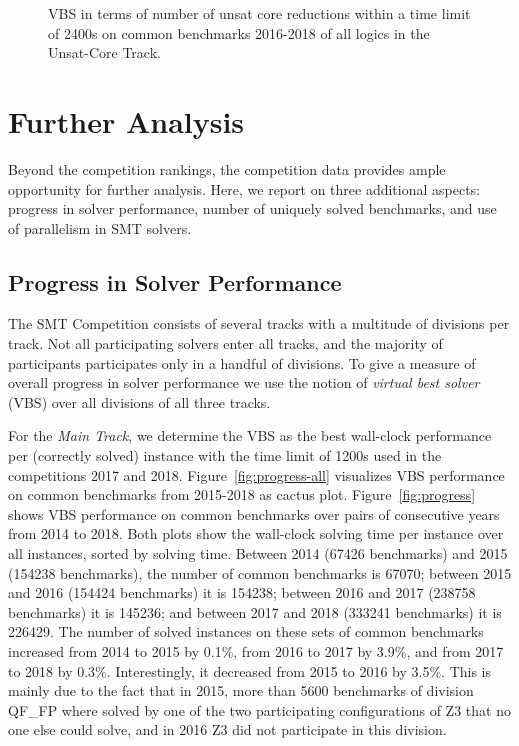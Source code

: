 \documentclass[dvipsnames,table,twoside,11pt]{article}
\newcommand{\maintrack}{Main Track\xspace}
\newcommand{\ucoretrack}{Unsat-Core Track\xspace}
\begin{document}
\begin{figure}
  \centering
  \vspace{-5ex}
  \caption{VBS in terms of number of unsat core reductions
  within a time limit of 2400s
  on common benchmarks 2016-2018 of all logics in the \ucoretrack.}
  \label{fig:progress-all-uc}
\end{figure}

\section{Further Analysis}
\label{sec:analysis}

Beyond the competition rankings, the competition data provides ample
opportunity for further analysis.  Here, we report on three additional
aspects: progress in solver performance, number of uniquely solved
benchmarks, and use of parallelism in SMT solvers.

\subsection{Progress in Solver Performance}

The SMT Competition consists of several tracks with a multitude of divisions
per track.
Not all participating solvers enter all tracks, and the majority of
participants participates only in a handful of divisions.
To give a measure of overall progress in solver performance we
use the notion of \emph{virtual best solver} (VBS) over all divisions of all
three tracks.

For the \emph{\maintrack}, we determine the VBS as the best wall-clock
performance per (correctly solved) instance with the time limit of 1200s used
in the competitions 2017 and 2018. Figure~\ref{fig:progress-all} visualizes VBS
performance on common benchmarks from 2015-2018 as cactus plot.
Figure~\ref{fig:progress} shows VBS performance on common benchmarks over pairs
of consecutive years from 2014 to 2018.  Both plots show the wall-clock solving
time per instance over all instances, sorted by solving time.
%
Between 2014 (67426 benchmarks) and 2015 (154238 benchmarks),
the number of common benchmarks is 67070;
between 2015 and 2016 (154424 benchmarks) it is 154238;
between 2016 and 2017 (238758 benchmarks) it is 145236;
and between 2017 and 2018 (333241 benchmarks) it is 226429.
The number of solved instances on these sets of common benchmarks
increased from 2014 to 2015 by 0.1\%, from 2016 to 2017 by 3.9\%,
and from 2017 to 2018 by 0.3\%.
Interestingly, it decreased from 2015 to 2016 by 3.5\%.
This is mainly due to the fact that in 2015, more than 5600 benchmarks of
division QF\_FP where solved by one of the two participating configurations of
Z3 that no one else could solve, and in 2016 Z3 did not participate in this
division.
\end{document}
